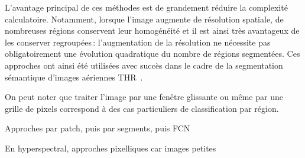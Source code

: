 L'avantage principal de ces méthodes est de grandement réduire la complexité calculatoire. Notamment, lorsque l'image augmente de résolution spatiale, de nombreuses régions conservent leur homogénéité et il est ainsi très avantageux de les conserver regroupées\,: l'augmentation de la résolution ne nécessite pas obligatoirement une évolution quadratique du nombre de régions segmentées. Ces approches ont ainsi été utilisées avec succès dans le cadre de la segmentation sémantique d'images aériennes \gls{THR}~\cite{lagrange_benchmarking_2015,vargas_superpixel-based_2014}.

On peut noter que traiter l'image par une fenêtre glissante ou même par une grille de pixels correspond à des cas particuliers de classification par région.

Approches par patch, puis par segments, puis FCN

En hyperspectral, approches pixelliques car images petites




